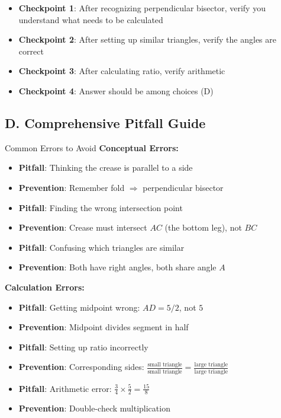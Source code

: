 \documentclass[12pt]{article}
\begin{document}
\begin{roadmapbox}
\begin{itemize}
    \item \textbf{Checkpoint 1}: After recognizing perpendicular bisector, verify you understand what needs to be calculated
    \item \textbf{Checkpoint 2}: After setting up similar triangles, verify the angles are correct
    \item \textbf{Checkpoint 3}: After calculating ratio, verify arithmetic
    \item \textbf{Checkpoint 4}: Answer should be among choices (D)
\end{itemize}

\subsection*{D. Comprehensive Pitfall Guide}

\begin{highlightbox}{Common Errors to Avoid}
\textbf{Conceptual Errors:}
\begin{itemize}
    \item \textbf{Pitfall}: Thinking the crease is parallel to a side
    \item \textbf{Prevention}: Remember fold $\Rightarrow$ perpendicular bisector
    
    \item \textbf{Pitfall}: Finding the wrong intersection point
    \item \textbf{Prevention}: Crease must intersect $AC$ (the bottom leg), not $BC$
    
    \item \textbf{Pitfall}: Confusing which triangles are similar
    \item \textbf{Prevention}: Both have right angles, both share angle $A$
\end{itemize}

\textbf{Calculation Errors:}
\begin{itemize}
    \item \textbf{Pitfall}: Getting midpoint wrong: $AD = 5/2$, not $5$
    \item \textbf{Prevention}: Midpoint divides segment in half
    
    \item \textbf{Pitfall}: Setting up ratio incorrectly
    \item \textbf{Prevention}: Corresponding sides: $\frac{\text{small triangle}}{\text{small triangle}} = \frac{\text{large triangle}}{\text{large triangle}}$
    
    \item \textbf{Pitfall}: Arithmetic error: $\frac{3}{4} \times \frac{5}{2} = \frac{15}{8}$
    \item \textbf{Prevention}: Double-check multiplication
\end{itemize}
\end{highlightbox}

\end{roadmapbox}
\end{document}
